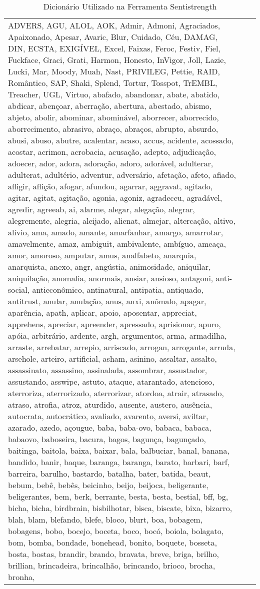 


\begin{longtable}{|*3{p{15cm}|}}
\caption{Dicionário Utilizado na Ferramenta Sentistrength} \label{appendix:dicionario-sentistrength}
    \hline
ADVERS, AGU, ALOL, AOK, Admir, Admoni, Agraciados, Apaixonado, Apesar, Avaric, Blur, Cuidado, Céu, DAMAG, DIN, ECSTA, EXIGÍVEL, Excel, Faixas, Feroc, Festiv, Fiel, Fuckface, Graci, Grati, Harmon, Honesto, InVigor, Joll, Lazie, Lucki, Mar, Moody, Muah, Nast, PRIVILEG, Pettie, RAID, Romântico, SAP, Shaki, Splend, Tortur, Tosspot, TrEMBL, Treacher, UGL, Virtuo, abafado, abandonar, abate, abatido, abdicar, abençoar, aberração, abertura, abestado, abismo, abjeto, abolir, abominar, abominável, aborrecer, aborrecido, aborrecimento, abrasivo, abraço, abraços, abrupto, absurdo, abusi, abuso, abutre, acalentar, acaso, accus, acidente, acossado, acostar, acrimon, acrobacia, acusação, adepto, adjudicação, adoecer, ador, adora, adoração, adoro, adorável, adulterar, adulterat, adultério, adventur, adversário, afetação, afeto, afiado, afligir, aflição, afogar, afundou, agarrar, aggravat, agitado, agitar, agitat, agitação, agonia, agoniz, agradeceu, agradável, agredir, agreeab, ai, alarme, alegar, alegação, alegrar, alegremente, alegria, aleijado, alienat, almejar, altercação, altivo, alívio, ama, amado, amante, amarfanhar, amargo, amarrotar, amavelmente, amaz, ambiguit, ambivalente, ambíguo, ameaça, amor, amoroso, amputar, amus, analfabeto, anarquia, anarquista, anexo, angr, angústia, animosidade, aniquilar, aniquilação, anomalia, anormais, ansiar, ansioso, antagoni, anti-social, antieconômico, antinatural, antipatia, antiquado, antitrust, anular, anulação, anus, anxi, anômalo, apagar, aparência, apath, aplicar, apoio, aposentar, appreciat, apprehens, apreciar, apreender, apressado, aprisionar, apuro, apóia, arbitrário, ardente, argh, argumentos, arma, armadilha, arraste, arrebatar, arrepio, arriscado, arrogan, arrogante, arruda, arsehole, arteiro, artificial, asham, asinino, assaltar, assalto, assassinato, assassino, assinalada, assombrar, assustador, assustando, asswipe, astuto, ataque, atarantado, atencioso, aterroriza, aterrorizado, aterrorizar, atordoa, atrair, atrasado, atraso, atrofia, atroz, aturdido, ausente, austero, ausência, autocrata, autocrático, avaliado, avarento, aversi, aviltar, azarado, azedo, açougue, baba, baba-ovo, babaca, babaca, babaovo, baboseira, bacura, bagos, bagunça, bagunçado, baitinga, baitola, baixa, baixar, bala, balbuciar, banal, banana, bandido, banir, baque, baranga, baranga, barato, barbari, barf, barreira, barulho, bastardo, batalha, bater, batida, beaut, bebum, bebê, bebês, beicinho, beijo, beijoca, beligerante, beligerantes, bem, berk, berrante, besta, besta, bestial, bff, bg, bicha, bicha, birdbrain, bisbilhotar, bisca, biscate, bixa, bizarro, blah, blam, blefando, blefe, bloco, blurt, boa, bobagem, bobagens, bobo, bocejo, boceta, boco, bocó, boiola, bolagato, bom, bomba, bondade, bonehead, bonito, boquete, bosseta, bosta, bostas, brandir, brando, bravata, breve, briga, brilho, brillian, brincadeira, brincalhão, brincando, brioco, brocha, bronha, 
\end{longtable}
